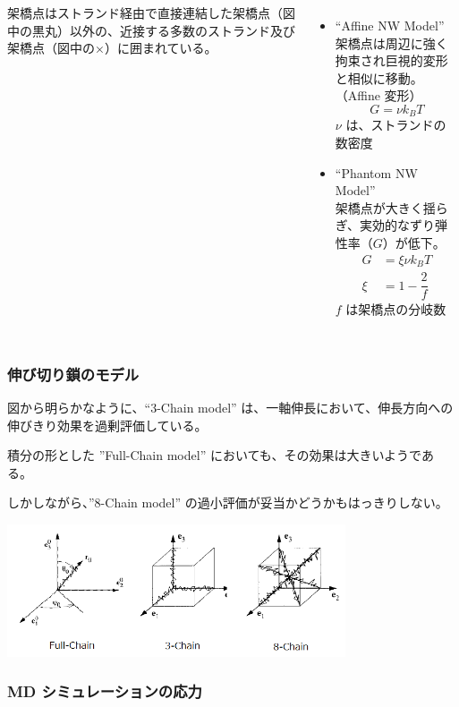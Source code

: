 \documentclass[11pt, dvipdfmx]{beamer}
\begin{document}
\begin{appendix}
\begin{frame}
\begin{columns}[totalwidth=1\textwidth]
架橋点はストランド経由で直接連結した架橋点（図中の黒丸）以外の、近接する多数のストランド及び架橋点（図中の×）に囲まれている。

\begin{itemize}
\item
``Affine NW Model''\\
架橋点は周辺に強く拘束され巨視的変形と相似に移動。\\（Affine 変形）
\footnotesize
\begin{equation*}
G=\nu k_B T
\end{equation*}
\normalsize
$\nu$ は、ストランドの数密度
\item
``Phantom NW Model''\\
架橋点が大きく揺らぎ、実効的なずり弾性率（$G$）が低下。
\footnotesize
\begin{align*}
G&=\xi \nu k_B T \\
\xi&= 1 -\dfrac{2}{f}
\end{align*}
\normalsize
$f$ は架橋点の分岐数
\end{itemize}
\end{columns}

\end{frame}

\begin{frame}
\frametitle{伸び切り鎖のモデル}

図から明らかなように、``3-Chain model'' は、一軸伸長において、伸長方向への伸びきり効果を過剰評価している。

積分の形とした ''Full-Chain model'' においても、その効果は大きいようである。

しかしながら、''8-Chain model'' の過小評価が妥当かどうかもはっきりしない。

\centering
\includegraphics[width=100mm]{./fig/Stretched_Chain.png}

\end{frame}



\begin{frame}
\frametitle{MD シミュレーションの応力}


\end{frame}
\end{appendix}
\end{document}
